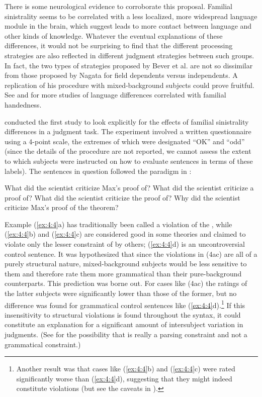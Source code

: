  There is some neurological evidence to corroborate this proposal. Familial sinistrality seems to be correlated with a less localized, more widespread language module in the brain, which \citet{BeverEtAl1987} suggest leads to more contact between language and other kinds of knowledge. Whatever the eventual explanations of these differences, it would not be surprising to find that the different processing strategies are also reflected in different judgment strategies between such groups. In fact, the two types of strategies proposed by Bever et al. are not so dissimilar from those proposed by Nagata for field dependents versus independents. A replication of his procedure with mixed-background subjects could prove fruitful. See \citet{BeverEtAl1989} and \citet{Bever1992} for more studies of language differences correlated with familial handedness.

\citet{Cowart1989} conducted the first study to look explicitly for the effects of familial sinistrality differences in a judgment task. The experiment involved a written questionnaire using a 4-point scale, the extremes of which were designated ``OK'' and ``odd'' (since the details of the procedure are not reported, we cannot assess the extent to which subjects were instructed on how to evaluate sentences in terms of these labels). The sentences in question followed the paradigm in :


\ea\label{ex:4:4}
\ea What did the scientist criticize Max's proof of? 
\ex What did the scientist criticize a proof of?
\ex What did the scientist criticize the proof of?
\ex Why did the scientist criticize Max's proof of the theorem?
\z
\z
   
\noindent
Example (\ref{ex:4:4}a) has traditionally been called a violation of the , while (\ref{ex:4:4}b) and (\ref{ex:4:4}c) are considered good in some theories and claimed to violate only the lesser constraint of  by others; (\ref{ex:4:4}d) is an uncontroversial control sentence. It was hypothesized that since the violations  in (4a\textendash{}c) are all of a purely structural nature, mixed-background subjects would be less sensitive to them and therefore rate them more grammatical than their pure-background counterparts. This prediction was borne out. For cases like (4a\textendash{}c) the ratings of the latter subjects were significantly lower than those of the former, but
no difference was found for grammatical control sentences 
like (\ref{ex:4:4}d).\footnote{Another result was that cases like (\ref{ex:4:4}b) and (\ref{ex:4:4}c) were rated significantly worse than (\ref{ex:4:4}d), suggesting that they might indeed constitute  violations (but see the caveats in ).}
 If this insensitivity to structural violations is found throughout the syntax, it could constitute an explanation for a significant amount of intersubject variation in judgments. (See  for the possibility that  is really a parsing constraint and not a grammatical constraint.)

